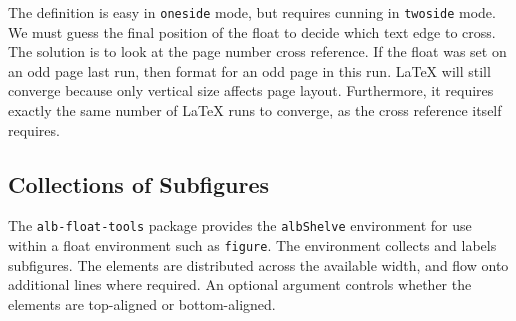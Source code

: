\documentclass[11pt,a4paper,oneside,titlepage]{alb-corp}
\begin{document}
\begin{description}
  The definition is easy in \texttt{oneside} mode, but requires cunning
  in \texttt{twoside} mode.  We must guess the final position of the
  float to decide which text edge to cross.  The solution is to look at
  the page number cross reference.  If the float was set on an odd page
  last run, then format for an odd page in this run.  LaTeX will still
  converge because only vertical size affects page layout.  Furthermore,
  it requires exactly the same number of LaTeX runs to converge, as the
  cross reference itself requires.
\end{description}


\subsection{Collections of Subfigures}
\label{sec:alb-float-tools-documentation:coll-subf}

The \texttt{alb-float-tools} package provides the \texttt{albShelve}
environment for use within a float environment such as \texttt{figure}.
The environment collects and labels subfigures.  The elements are
distributed across the available width, and flow onto additional lines
where required.  An optional argument controls whether the elements are
top-aligned or bottom-aligned.
\end{document}
